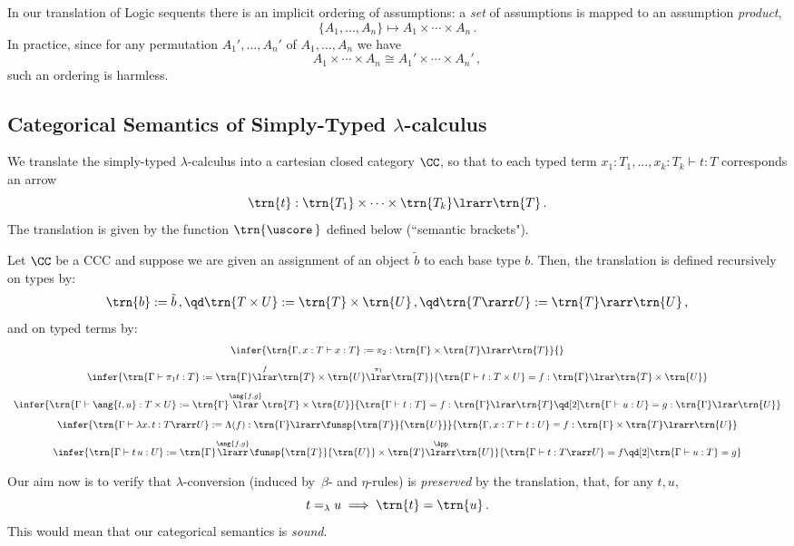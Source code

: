 \documentclass[12pt]{article}
\begin{document}
\begin{myremark}
In our translation of Logic sequents there is an implicit ordering of assumptions: a \emph{set} of assumptions is mapped to an assumption \emph{product},
\[ \{A_1,\dots,A_n\} \longmapsto A_1\times\cdots\times A_n\,. \]
In practice, since for any permutation $A_1',\dots,A_n'$ of $A_1,\dots,A_n$ we have
\[ A_1\times\cdots\times A_n \cong A_1'\times\cdots\times A_n'\,,\]
such an ordering is harmless.
\end{myremark}

\subsection{Categorical Semantics of Simply-Typed $\lambda$-calculus}

We translate the simply-typed $\lambda$-calculus into a cartesian closed category $\CC$, so that to each typed term $x_1:T_1,...,x_k:T_k\vdash t:T$
corresponds an arrow
\[ \trn{t}:\trn{T_1}\times\cdots\times\trn{T_k}\lrarr\trn{T}\,. \]
The translation is given by the function $\trn{\uscore\,}$ defined below (``semantic brackets").

\begin{mydefinition}\label{d:SemTr}
Let $\CC$ be a CCC and suppose we are given an assignment of an object $\tilde{b}$ to each base type $b$. Then, the translation is defined recursively
on types by:
\[ \trn{b}:=\tilde{b} \,,\qd \trn{T\times U}:=\trn{T}\times\trn{U} \,,\qd \trn{T\rarr U}:=\trn{T}\rarr\trn{U}\,, \]
and on typed terms by:
\[\begin{array}{c}
\infer{\trn{\Gamma,x:T\vdash x:T} := \pi_2:\trn{\Gamma}\times\trn{T}\lrarr\trn{T}}{}
\\[3mm]
\infer{\trn{\Gamma\vdash\pi_1 t:T}:=\trn{\Gamma}\overset{f}{\lrar}\trn{T}\times\trn{U}\overset{\pi_1}{\lrar}\trn{T}}{%
    \trn{\Gamma\vdash t:T\times U}=f:\trn{\Gamma}\lrar\trn{T}\times\trn{U}}
\\[3mm]
\infer{\trn{\Gamma\vdash \ang{t,u}:T\times U}:=\trn{\Gamma}\overset{\ang{f,g}}{\lrar}\trn{T}\times\trn{U}}{%
    \trn{\Gamma\vdash t:T}=f:\trn{\Gamma}\lrar\trn{T}\qd[2]\trn{\Gamma\vdash u:U}=g:\trn{\Gamma}\lrar\trn{U}}
\\[3mm]
\infer{\trn{\Gamma\vdash\lambda x.\,t:T\rarr U}:=\Lambda(f):\trn{\Gamma}\lrarr\funsp{\trn{T}}{\trn{U}}}{%
    \trn{\Gamma,x:T\vdash t:U}=f:\trn{\Gamma}\times\trn{T}\lrarr\trn{U}}
\\[3mm]
\infer{\trn{\Gamma\vdash t\,u: U}:=\trn{\Gamma}\overset{\ang{f,g}}{\lrarr}\funsp{\trn{T}}{\trn{U}}\times\trn{T}
    \overset{\App}{\lrarr}\trn{U}}{%
        \trn{\Gamma\vdash t:T\rarr U}=f\qd[2]\trn{\Gamma\vdash u:T}=g}
\end{array}\]\deq[-1]
\end{mydefinition}
%
Our aim now is to verify that $\lambda$-conversion (induced by~$\beta$- and $\eta$-rules) is \emph{preserved} by the translation, \ie that, for any
$t,u$,
\[ t=_\lambda u \implies \trn{t}=\trn{u}\,. \]
This would mean that our categorical semantics is \emph{sound}.
\end{document}

